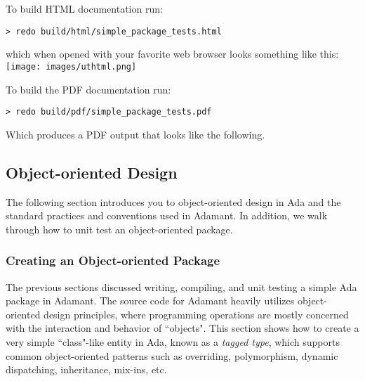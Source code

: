 To build HTML documentation run:

\vspace{5mm} %
\begin{verbatim}
> redo build/html/simple_package_tests.html
\end{verbatim}
\vspace{5mm} %

which when opened with your favorite web browser looks something like this: \\

\vspace{5mm} %
\texttt{[image: images/uthtml.png]}
\vspace{5mm} %

To build the PDF documentation run:

\vspace{5mm} %
\begin{verbatim}
> redo build/pdf/simple_package_tests.pdf
\end{verbatim}
\vspace{5mm} %

Which produces a PDF output that looks like the following. \\

\noindent\makebox[\linewidth]{\rule{\textwidth}{0.4pt}}

\noindent\makebox[\linewidth]{\rule{\textwidth}{0.4pt}}


\subsection{Object-oriented Design}

The following section introduces you to object-oriented design in Ada and the standard practices and conventions used in Adamant. In addition, we walk through how to unit test an object-oriented package.

\subsubsection{Creating an Object-oriented Package}

The previous sections discussed writing, compiling, and unit testing a simple Ada package in Adamant. The source code for Adamant heavily utilizes object-oriented design principles, where programming operations are mostly concerned with the interaction and behavior of ``objects". This section shows how to create a very simple ``class"-like entity in Ada, known as a \textit{tagged type}, which supports common object-oriented patterns such as overriding, polymorphism, dynamic dispatching, inheritance, mix-ins, etc. \\

